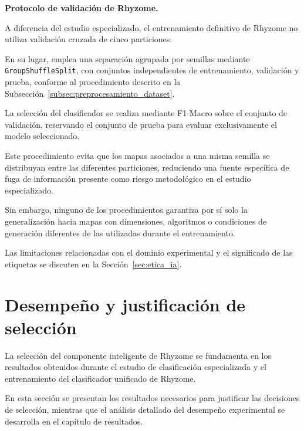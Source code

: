 \textbf{Protocolo de validación de Rhyzome.}

A diferencia del estudio especializado, el entrenamiento definitivo de Rhyzome no utiliza validación cruzada de cinco particiones.

En su lugar, emplea una separación agrupada por semillas mediante \texttt{GroupShuffleSplit}, con conjuntos independientes de entrenamiento, validación y prueba, conforme al procedimiento descrito en la Subsección~\ref{subsec:preprocesamiento_dataset}.

La selección del clasificador se realiza mediante F1 Macro sobre el conjunto de validación, reservando el conjunto de prueba para evaluar exclusivamente el modelo seleccionado.

Este procedimiento evita que los mapas asociados a una misma semilla se distribuyan entre las diferentes particiones, reduciendo una fuente específica de fuga de información presente como riesgo metodológico en el estudio especializado.

Sin embargo, ninguno de los procedimientos garantiza por sí solo la generalización hacia mapas con dimensiones, algoritmos o condiciones de generación diferentes de las utilizadas durante el entrenamiento.

Las limitaciones relacionadas con el dominio experimental y el significado de las etiquetas se discuten en la Sección~\ref{sec:etica_ia}.

\FloatBarrier


\section{Desempeño y justificación de selección}
\label{sec:desempeno_ia}

La selección del componente inteligente de Rhyzome se fundamenta en los resultados obtenidos durante el estudio de clasificación especializada y el entrenamiento del clasificador unificado de Rhyzome.

En esta sección se presentan los resultados necesarios para justificar las decisiones de selección, mientras que el análisis detallado del desempeño experimental se desarrolla en el capítulo de resultados.


